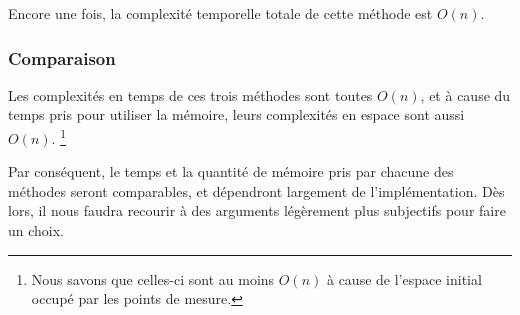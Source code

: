 Encore une fois, la complexité temporelle totale de cette méthode est $O(n)$.

\subsubsection*{Comparaison}

Les complexités en temps de ces trois méthodes sont toutes $O(n)$,
et à cause du temps pris pour utiliser la mémoire,
leurs complexités en espace sont aussi $O(n)$.%
\footnote{
    Nous savons que celles-ci sont au moins $O(n)$ à cause de l'espace
    initial occupé par les points de mesure.
}

Par conséquent, le temps et la quantité de mémoire pris par
chacune des méthodes seront comparables,
et dépendront largement de l'implémentation.
Dès lors, il nous faudra recourir à des arguments légèrement plus subjectifs
pour faire un choix.
